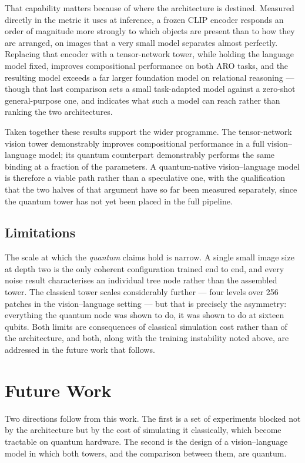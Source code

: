 \documentclass[12pt, a4paper, oneside]{report}
\begin{document}
That capability matters because of where the architecture is destined. Measured
directly in the metric it uses at inference, a frozen CLIP encoder responds an
order of magnitude more strongly to which objects are present than to how they
are arranged, on images that a very small model separates almost perfectly.
Replacing that encoder with a tensor-network tower, while holding the language
model fixed, improves compositional performance on both ARO tasks, and the
resulting model exceeds a far larger foundation model on relational reasoning
--- though that last comparison sets a small task-adapted model against a
zero-shot general-purpose one, and indicates what such a model can reach rather
than ranking the two architectures.

Taken together these results support the wider programme. The tensor-network
vision tower demonstrably improves compositional performance in a full
vision--language model; its quantum counterpart demonstrably performs the same
binding at a fraction of the parameters. A quantum-native vision--language
model is therefore a viable path rather than a speculative one, with the
qualification that the two halves of that argument have so far been measured
separately, since the quantum tower has not yet been placed in the full
pipeline.

\subsection{Limitations}

The scale at which the \emph{quantum} claims hold is narrow. A single small
image size at depth two is the only coherent configuration trained end to end,
and every noise result characterises an individual tree node rather than the
assembled tower. The classical tower scales considerably further --- four
levels over 256 patches in the vision--language setting --- but that is
precisely the asymmetry: everything the quantum node was shown to do, it was
shown to do at sixteen qubits. Both limits are consequences of classical
simulation cost rather than of the architecture, and both, along with the
training instability noted above, are addressed in the future work that
follows.


\section{Future Work}

Two directions follow from this work. The first is a set of experiments blocked
not by the architecture but by the cost of simulating it classically, which
become tractable on quantum hardware. The second is the design of a
vision--language model in which both towers, and the comparison between them,
are quantum.
\end{document}

